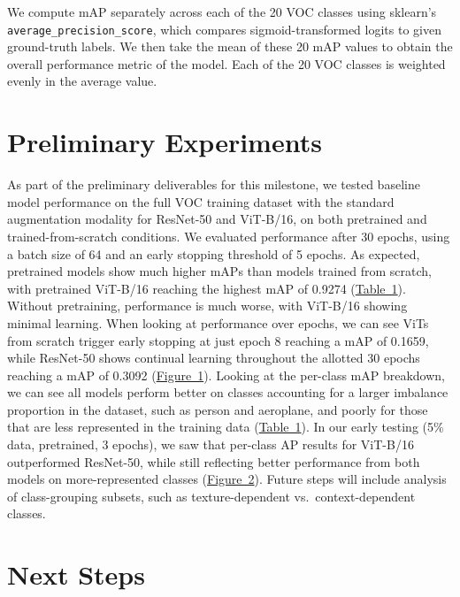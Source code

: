 \documentclass{article}
\begin{document}
We compute mAP separately across each of the 20 VOC classes using sklearn's \texttt{average\_precision\_score}, which compares sigmoid-transformed logits to given ground-truth labels. We then take the mean of these 20 mAP values to obtain the overall performance metric of the model. Each of the 20 VOC classes is weighted evenly in the average value.


\section{Preliminary Experiments}

As part of the preliminary deliverables for this milestone, we tested baseline model performance on the full VOC training dataset with the standard augmentation modality for ResNet-50 and ViT-B/16, on both pretrained and trained-from-scratch conditions. We evaluated performance after 30 epochs, using a batch size of 64 and an early stopping threshold of 5 epochs. As expected, pretrained models show much higher mAPs than models trained from scratch, with pretrained ViT-B/16 reaching the highest mAP of 0.9274 (\href{https://github.com/sanghoonio/image-cnn-transformers/blob/main/reports/figures/baseline_results.md}{Table~1}). Without pretraining, performance is much worse, with ViT-B/16 showing minimal learning. When looking at performance over epochs, we can see ViTs from scratch trigger early stopping at just epoch 8 reaching a mAP of 0.1659, while ResNet-50 shows continual learning throughout the allotted 30 epochs reaching a mAP of 0.3092 (\href{https://github.com/sanghoonio/image-cnn-transformers/blob/main/reports/figures/training_curves.png}{Figure~1}). Looking at the per-class mAP breakdown, we can see all models perform better on classes accounting for a larger imbalance proportion in the dataset, such as person and aeroplane, and poorly for those that are less represented in the training data (\href{https://github.com/sanghoonio/image-cnn-transformers/blob/main/reports/figures/baseline_results.md}{Table~1}). In our early testing (5\% data, pretrained, 3 epochs), we saw that per-class AP results for ViT-B/16 outperformed ResNet-50, while still reflecting better performance from both models on more-represented classes (\href{https://github.com/sanghoonio/image-cnn-transformers/blob/main/reports/figures/per_class_ap_comparison_bg.png}{Figure~2}). Future steps will include analysis of class-grouping subsets, such as texture-dependent vs.\ context-dependent classes.


\section{Next Steps}
\end{document}
